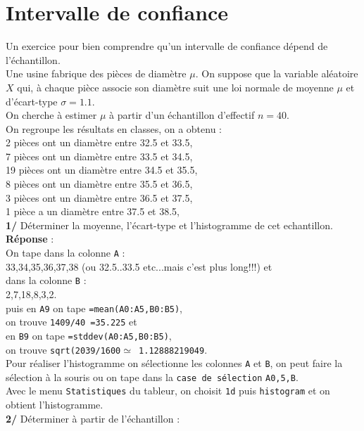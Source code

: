 \documentclass[a4paper,11pt]{book}
\begin{document}
\section{Intervalle de confiance}
Un exercice pour bien comprendre qu'un intervalle de confiance d\'epend de 
l'\'echantillon.\\
Une usine fabrique des pi\`eces de diam\`etre $\mu$. On suppose que la variable
 al\'eatoire $X$ qui, \`a chaque pi\`ece associe son diam\`etre suit une loi 
normale de moyenne $\mu$ et d'\'ecart-type $\sigma=1.1$.\\
On cherche \`a estimer $\mu$ \`a partir d'un \'echantillon d'effectif $n=40$.\\
On regroupe les r\'esultats en classes, on a obtenu :\\
2 pi\`eces ont un diam\`etre entre 32.5 et 33.5,\\ 
7 pi\`eces ont un diam\`etre entre 33.5 et 34.5,\\
19 pi\`eces ont un diam\`etre entre 34.5 et 35.5,\\
8 pi\`eces ont un diam\`etre entre 35.5 et 36.5,\\
3 pi\`eces ont un diam\`etre entre 36.5 et 37.5,\\
1 pi\`ece a un diam\`etre entre 37.5 et 38.5,\\
{\bf 1/} D\'eterminer la moyenne, l'\'ecart-type et l'histogramme de cet echantillon.\\
{\bf R\'eponse} :\\
On tape dans la colonne {\tt A} :\\
 33,34,35,36,37,38 (ou 32.5..33.5 etc...mais c'est plus long!!!) et\\
dans la colonne {\tt B} :\\
2,7,18,8,3,2.\\
puis en {\tt A9} on tape  {\tt =mean(A0:A5,B0:B5)},\\
 on trouve {\tt 1409/40 =35.225} et\\
en {\tt B9} on tape  {\tt =stddev(A0:A5,B0:B5)},\\
on trouve 
{\tt sqrt(2039/1600$\simeq$ 1.12888219049}.\\
Pour r\'ealiser l'histogramme on s\'electionne les colonnes {\tt A} et {\tt B},
 on peut faire la s\'election \`a la souris ou on
tape dans la {\tt case de s\'election} {\tt A0,5,B}.\\
Avec le menu {\tt Statistiques} du tableur, on choisit {\tt 1d}  puis 
{\tt histogram} et on obtient l'histogramme.\\
{\bf 2/}  D\'eterminer \`a partir de l'\'echantillon :
\end{document}
